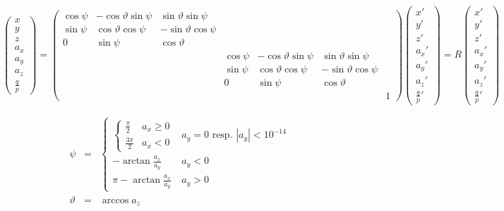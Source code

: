 \documentclass{article}
\begin{document}
\[ \left(\begin{array}{c} x\\ y\\ z\\ a_{x}\\ a_{y}\\ a_{z}\\ \frac{q}{p}\end{array}\right)=\left(\begin{array}{ccccccc} \cos\psi & -\cos\vartheta\sin\psi & \sin\vartheta\sin\psi\\ \sin\psi & \cos\vartheta\cos\psi & -\sin\vartheta\cos\psi\\ 0 & \sin\psi & \cos\vartheta\\ & & & \cos\psi & -\cos\vartheta\sin\psi & \sin\vartheta\sin\psi\\ & & & \sin\psi & \cos\vartheta\cos\psi & -\sin\vartheta\cos\psi\\ & & & 0 & \sin\psi & \cos\vartheta\\ & & & & & & 1\end{array}\right)\left(\begin{array}{c} x'\\ y'\\ z'\\ a_{x}'\\ a_{y}'\\ a_{z}'\\ \frac{q}{p}'\end{array}\right)=R\left(\begin{array}{c} x'\\ y'\\ z'\\ a_{x}'\\ a_{y}'\\ a_{z}'\\ \frac{q}{p}'\end{array}\right) \]
\pagebreak

\begin{eqnarray*} \psi & = & \begin{cases} \begin{cases} \frac{\pi}{2} & a_{x} \geq 0 \\ \frac{3\pi}{2} & a_{x} < 0 \end{cases} & a_{y}=0 \mbox{ resp. } |a_{y}|<10^{-14} \\ - \arctan \frac{a_{x}}{a_{y}} & a_{y} < 0 \\ \pi - \arctan \frac{a_{x}}{a_{y}} & a_{y} > 0 \end{cases} \\ \vartheta & = & \arccos a_{z} \end{eqnarray*}
\pagebreak
\end{document}
